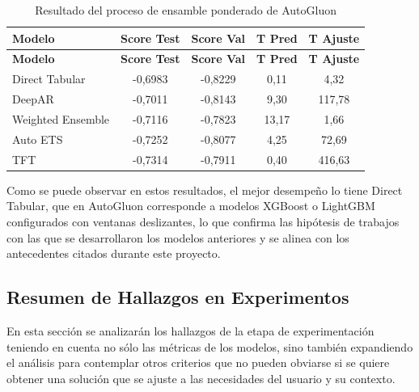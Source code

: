 \begin{longtable}[]{@{}
lcccc@{}}
\caption{Resultado del proceso de ensamble ponderado de AutoGluon}
\label{tab:resultado-del-proceso-de-ensamble-ponder}\\
\toprule\noalign{}
\textbf{Modelo} & \textbf{Score Test} & \textbf{Score Val} & \textbf{T Pred} & \textbf{T Ajuste} \\
\midrule\noalign{}
\endfirsthead
\toprule\noalign{}
\textbf{Modelo} & \textbf{Score Test} & \textbf{Score Val} & \textbf{T Pred} & \textbf{T Ajuste} \\
\midrule\noalign{}
\endhead
\bottomrule\noalign{}
\endlastfoot
Direct Tabular & -0,6983 & -0,8229 & 0,11 & 4,32 \\
DeepAR & -0,7011 & -0,8143 & 9,30 & 117,78 \\
Weighted Ensemble & -0,7116 & -0,7823 & 13,17 & 1,66 \\
Auto ETS & -0,7252 & -0,8077 & 4,25 & 72,69 \\
TFT & -0,7314 & -0,7911 & 0,40 & 416,63 \\
\end{longtable}


Como se puede observar en estos resultados, el mejor desempeño lo tiene Direct Tabular, que en AutoGluon corresponde a modelos XGBoost o LightGBM configurados con ventanas deslizantes, lo que confirma las hipótesis de trabajos con las que se desarrollaron los modelos anteriores y se alinea con los antecedentes citados durante este proyecto.

\subsection{Resumen de Hallazgos en Experimentos}\label{resumen-de-hallazgos-en-experimentos}

En esta sección se analizarán los hallazgos de la etapa de experimentación teniendo en cuenta no sólo las métricas de los modelos, sino también expandiendo el análisis para contemplar otros criterios que no pueden obviarse si se quiere obtener una solución que se ajuste a las necesidades del usuario y su contexto.

